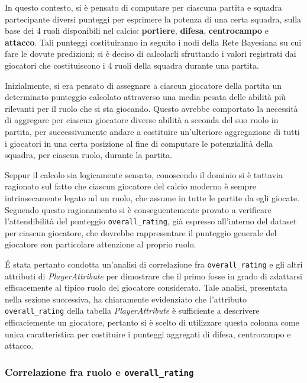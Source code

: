 \documentclass[hidelinks, 12pt]{article}
\begin{document}
In questo contesto, si è pensato di computare per ciascuna partita e squadra partecipante diversi punteggi per esprimere la potenza di una certa squadra, sulla base dei 4 ruoli disponibili nel calcio: \textbf{portiere}, \textbf{difesa}, \textbf{centrocampo} e \textbf{attacco}. Tali punteggi costituiranno in seguito i nodi della Rete Bayesiana su cui fare le dovute predizioni; si è deciso di calcolarli sfruttando i valori registrati dai giocatori che costituiscono i 4 ruoli della squadra durante una partita.

\vspace{3ex}

Inizialmente, si era pensato di assegnare a ciascun giocatore della partita un determinato punteggio calcolato attraverso una media pesata delle abilità più rilevanti per il ruolo che si sta giocando. Questo avrebbe comportato la necessità di aggregare per ciascun giocatore diverse abilità a seconda del suo ruolo in partita, per successivamente andare a costituire un'ulteriore aggregazione di tutti i giocatori in una certa posizione al fine di computare le potenzialità della squadra, per ciascun ruolo, durante la partita. 

Seppur il calcolo sia logicamente sensato, conoscendo il dominio si è tuttavia ragionato sul fatto che ciascun giocatore del calcio moderno è sempre intrinsecamente legato ad un ruolo, che assume in tutte le partite da egli giocate. Seguendo questo ragionamento si è conseguentemente provato a verificare l'attendibilità del punteggio \texttt{overall\_rating}, già espresso all'interno del dataset per ciascun giocatore, che dovrebbe rappresentare il punteggio generale del giocatore con particolare attenzione al proprio ruolo. 

É stata pertanto condotta un'analisi di correlazione fra \texttt{overall\_rating} e gli altri attributi di \textit{PlayerAttribute} per dimostrare che il primo fosse in grado di adattarsi efficacemente al tipico ruolo del giocatore considerato. Tale analisi, presentata nella sezione successiva, ha chiaramente evidenziato che l'attributo \texttt{overall\_rating} della tabella \textit{PlayerAttribute} è sufficiente a descrivere efficaciemente un giocatore, pertanto si è scelto di utilizzare questa colonna come unica caratteristica per costituire i punteggi aggregati di difesa, centrocampo e attacco. 


\subsubsection{Correlazione fra ruolo e \texttt{overall\_rating}}
\end{document}
